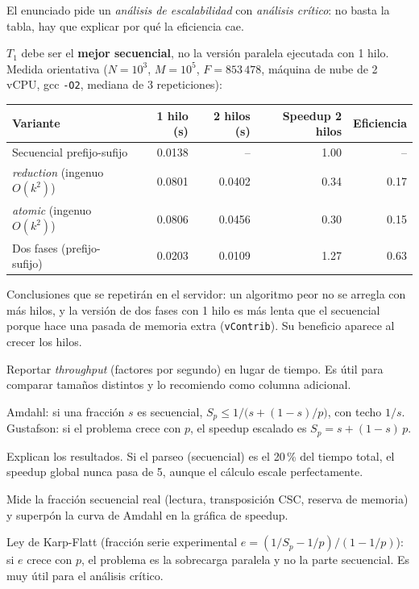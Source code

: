 \porque El enunciado pide un \emph{análisis de escalabilidad} con \emph{análisis crítico}: no basta la tabla, hay que explicar por qué la eficiencia cae.

\como $T_1$ debe ser el \textbf{mejor secuencial}, no la versión paralela ejecutada con 1 hilo. Medida orientativa ($N=10^3$, $M=10^5$, $F=853\,478$, máquina de nube de 2 vCPU, gcc \texttt{-O2}, mediana de 3 repeticiones):

\begin{center}\small
\begin{tabular}{@{}lrrrr@{}}
\toprule
Variante & 1 hilo (s) & 2 hilos (s) & Speedup 2 hilos & Eficiencia \\
\midrule
Secuencial prefijo-sufijo & 0.0138 & -- & 1.00 & -- \\
\emph{reduction} (ingenuo $O(k^2)$) & 0.0801 & 0.0402 & 0.34 & 0.17 \\
\emph{atomic} (ingenuo $O(k^2)$) & 0.0806 & 0.0456 & 0.30 & 0.15 \\
Dos fases (prefijo-sufijo) & 0.0203 & 0.0109 & 1.27 & 0.63 \\
\bottomrule
\end{tabular}
\end{center}

Conclusiones que se repetirán en el servidor: un algoritmo peor no se arregla con más hilos, y la versión de dos fases con 1 hilo es más lenta que el secuencial porque hace una pasada de memoria extra (\texttt{vContrib}). Su beneficio aparece al crecer los hilos.

\alt Reportar \emph{throughput} (factores por segundo) en lugar de tiempo. Es útil para comparar tamaños distintos y lo recomiendo como columna adicional.

\que Amdahl: si una fracción $s$ es secuencial, $S_p\le 1/\big(s+(1-s)/p\big)$, con techo $1/s$. Gustafson: si el problema crece con $p$, el speedup escalado es $S_p=s+(1-s)\,p$.

\porque Explican los resultados. Si el parseo (secuencial) es el 20\,\% del tiempo total, el speedup global nunca pasa de 5, aunque el cálculo escale perfectamente.

\como Mide la fracción secuencial real (lectura, transposición CSC, reserva de memoria) y superpón la curva de Amdahl en la gráfica de speedup.

\alt Ley de Karp-Flatt (fracción serie experimental $e=(1/S_p-1/p)/(1-1/p)$): si $e$ crece con $p$, el problema es la sobrecarga paralela y no la parte secuencial. Es muy útil para el análisis crítico.

